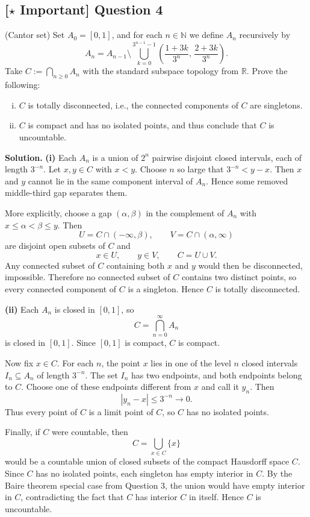 \documentclass{article}
\newcommand{\R}{\mathbb{R}}
\newcommand{\N}{\mathbb{N}}
\newcommand{\important}{\texorpdfstring{\textbf{[\(\star\) Important]}}{[Important]}}
\newenvironment{solution}{\par\noindent\textbf{Solution.}\quad}{\par}
\begin{document}
\subsection{\important{} Question 4}
(Cantor set) Set $A_0 = [0,1]$, and for each $n \in \N$ we define $A_n$ recursively by
\[
  A_n = A_{n-1} \setminus \bigcup_{k=0}^{3^{n-1}-1} \left(\frac{1+3k}{3^n},\,\frac{2+3k}{3^n}\right).
\]
Take $C := \bigcap_{n \ge 0} A_n$ with the standard subspace topology from $\R$. Prove the following:
\begin{enumerate}[(i)]
  \item $C$ is totally disconnected, i.e., the connected components of $C$ are singletons.
  \item $C$ is compact and has no isolated points, and thus conclude that $C$ is uncountable.
\end{enumerate}

\begin{solution}
\textbf{(i)} Each $A_n$ is a union of $2^n$ pairwise disjoint closed
intervals, each of length $3^{-n}$. Let $x,y\in C$ with $x<y$. Choose
$n$ so large that $3^{-n}<y-x$. Then $x$ and $y$ cannot lie in the same
component interval of $A_n$. Hence some removed middle-third gap separates
them.

More explicitly, choose a gap $(\alpha,\beta)$ in the complement of
$A_n$ with $x\le\alpha<\beta\le y$. Then
\[
  U=C\cap(-\infty,\beta),\qquad
  V=C\cap(\alpha,\infty)
\]
are disjoint open subsets of $C$ and
\[
  x\in U,\qquad y\in V,\qquad C=U\cup V.
\]
Any connected subset of $C$ containing both $x$ and $y$ would then be
disconnected, impossible. Therefore no connected subset of $C$ contains
two distinct points, so every connected component of $C$ is a singleton.
Hence $C$ is totally disconnected.

\textbf{(ii)} Each $A_n$ is closed in $[0,1]$, so
\[
  C=\bigcap_{n=0}^{\infty}A_n
\]
is closed in $[0,1]$. Since $[0,1]$ is compact, $C$ is compact.

Now fix $x\in C$. For each $n$, the point $x$ lies in one of the level
$n$ closed intervals $I_n\subseteq A_n$ of length $3^{-n}$. The set
$I_n$ has two endpoints, and both endpoints belong to $C$. Choose one of
these endpoints different from $x$ and call it $y_n$. Then
\[
  |y_n-x|\le 3^{-n}\to0.
\]
Thus every point of $C$ is a limit point of $C$, so $C$ has no isolated
points.

Finally, if $C$ were countable, then
\[
  C=\bigcup_{x\in C}\{x\}
\]
would be a countable union of closed subsets of the compact Hausdorff
space $C$. Since $C$ has no isolated points, each singleton has empty
interior in $C$. By the Baire theorem special case from Question 3, the
union would have empty interior in $C$, contradicting the fact that
$C$ has interior $C$ in itself. Hence $C$ is uncountable.
\end{solution}
\end{document}
